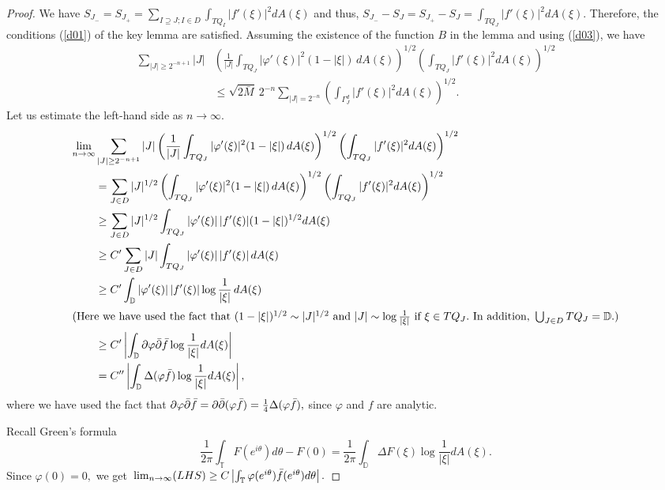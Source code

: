 \documentclass[psamsfonts]{conm-p-l}
\theoremstyle{definition}
\theoremstyle{remark}
\numberwithin{equation}{section}
\begin{document}
\begin{proof}
We have $S_{J_-}=S_{J_+}=\sum_{I\supseteq J; I\in D}\int_{TQ_I}|f'(\xi)|^2dA(\xi)$ and thus,
$S_{J_-}-S_J=S_{J_+}-S_J=\int_{TQ_J}|f'(\xi)|^2dA(\xi).$ Therefore, the conditions (\ref{d01}) of the key lemma are satisfied.
Assuming the existence of the function $B$ in the lemma and using (\ref{d03}), we have
\begin{align*}
\sum_{|J|\ge 2^{{-n+1}}}|J|&\left(\frac1{|J|}\int_{TQ_J}|\varphi'(\xi)|^2(1-|\xi|)\,dA(\xi)\right)^{1/2}
\left(\int_{TQ_J}|f'(\xi)|^2dA(\xi)\right)^{1/2}\\
&\le\sqrt{2\bar{M}}~2^{-n}\sum_{|J|=2^{{-n}}}\left(\int_{\Gamma^d_J}|f'(\xi)|^2dA(\xi)\right)^{1/2}.
\end{align*}
Let us estimate the left-hand side as $n\to\infty.$
\begin{align*}
\lim_{n\to\infty}&\sum_{|J|\ge 2^{{-n+1}}}|J|\left(\frac1{|J|}\int_{TQ_J}|\varphi'(\xi)|^2(1-|\xi|)\,dA(\xi)\right)^{1/2}
\left(\int_{TQ_J}|f'(\xi)|^2dA(\xi)\right)^{1/2}\\
&{\displaystyle}=\sum_{J\in D}|J|^{1/2}\left(\int_{TQ_J}|\varphi'(\xi)|^2(1-|\xi|)\,dA(\xi)\right)^{1/2}
\left(\int_{TQ_J}|f'(\xi)|^2dA(\xi)\right)^{1/2}\\
&{\displaystyle}\ge\sum_{J\in D}|J|^{1/2}\int_{TQ_J}|\varphi'(\xi)|\,|f'(\xi)|(1-|\xi|)^{1/2}dA(\xi)\\
&{\displaystyle}\ge C'\sum_{J\in D}|J|\int_{TQ_J}|\varphi'(\xi)|\,|f'(\xi)|\,dA(\xi)\\
&{\displaystyle}\ge C'\int_\mathbb{D}|\varphi'(\xi)|\,|f'(\xi)|\log{\frac1{|\xi|}}\,dA(\xi)\\*
\intertext{\noindent
(Here we have used the fact that ${\displaystyle} (1-|\xi|)^{1/2}\sim |J|^{1/2}$ and ${\displaystyle} |J|\sim \log{\frac1{|\xi|}}$ if $\xi\in TQ_J.$ In addition, ${\displaystyle} \bigcup_{J\in D}TQ_J=\mathbb{D}.$)}
&{\displaystyle}\ge C'\left|\int_\mathbb{D}{\partial} \varphi \bar{\partial} \bar{f} \log{\frac1{|\xi|}}dA(\xi)\right|\\
&{\displaystyle}=C''\left|\int_\mathbb{D}\Delta(\varphi \bar{f})\log{\frac1{|\xi|}}dA(\xi)\right|,
\end{align*}
where we have used the fact that ${\displaystyle} {\partial} \varphi \bar{\partial} \bar{f}={\partial}\bar{\partial}(\varphi \bar{f})=\frac14\Delta(\varphi \bar{f}),$ since $\varphi$ and $f$ are analytic.
\par

Recall Green's formula
$$
\frac1{2\pi}\int_\mathbb{T}F(e^{i\theta})d\theta-F(0)=\frac1{2\pi}\int_\mathbb{D}\Delta F(\xi)\log\frac1{|\xi|}dA(\xi).
$$
Since $\varphi(0)=0,$ we get ${\displaystyle} \lim_{n\to \infty}(LHS)\ge C\left|\int_\mathbb{T}
\varphi(e^{i\theta})\bar{f}(e^{i\theta})d\theta\right|.$
\par


\end{proof}
\end{document}
